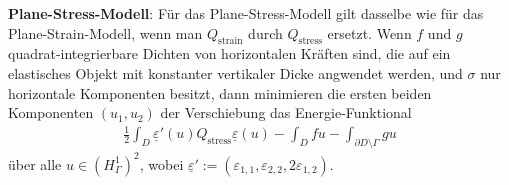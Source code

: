 \textbf{Plane-Stress-Modell}:
Für das Plane-Stress-Modell gilt dasselbe wie für das Plane-Strain-Modell,
wenn man $Q_{\text{strain}}$ durch $Q_{\text{stress}}$ ersetzt.
Wenn $f$ und $g$ quadrat-integrierbare Dichten von horizontalen Kräften sind,
die auf ein elastisches Objekt mit konstanter vertikaler Dicke angwendet werden,
und $\sigma$ nur horizontale Komponenten besitzt, dann
minimieren die ersten beiden Komponenten $(u_1, u_2)$ der Verschiebung das Energie-Funktional
\begin{align*}
    \frac{1}{2} \int_D \underline{\varepsilon}'(u) Q_{\text{stress}} \underline{\varepsilon}(u) -
    \int_D fu - \int_{\partial D \setminus \Gamma} gu
\end{align*}
über alle $u \in (H_\Gamma^1)^2$, wobei
$\underline{\varepsilon}' := (\varepsilon_{1,1}, \varepsilon_{2,2}, 2\varepsilon_{1,2})$.

\pagebreak
